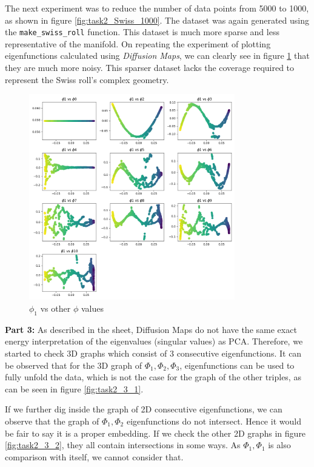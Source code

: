 The next experiment was to reduce the number of data points from 5000 to 1000, as shown in figure \ref{fig:task2_Swiss_1000}. The dataset was again generated using the \texttt{make\_swiss\_roll} function. This dataset is much more sparse and less representative of the manifold. On repeating the experiment of plotting eigenfunctions calculated using \textit{Diffusion Maps}, we can clearly see in figure \ref{fig:task2.22} that they are much more noisy. This sparser dataset lacks the coverage required to represent the Swiss roll's complex geometry.

\begin{figure}[H]
    \centering
    \includegraphics[width=0.8\textwidth]{images/ex3task2_1000vals.png}
    \caption{$\phi_1$ vs other $\phi$ values}
    \label{fig:task2.22}
\end{figure}


\textbf{Part 3:} As described in the sheet, Diffusion Maps do not have the same exact energy interpretation of the eigenvalues (singular values) as PCA. Therefore, we started to check 3D graphs which consist of 3 consecutive eigenfunctions. It can be observed that for the 3D graph of $\Phi_1, \Phi_2, \Phi_3$, eigenfunctions can be used to fully unfold the data, which is not the case for the graph of the other triples, as can be seen in figure \ref{fig:task2_3_1}. 


If we further dig inside the graph of 2D consecutive eigenfunctions, we can observe that the graph of $\Phi_1, \Phi_2 $ eigenfunctions do not intersect. Hence it would be fair to say it is a proper embedding. If we check the other 2D graphs in figure \ref{fig:task2_3_2}, they all contain intersections in some ways. As $\Phi_1, \Phi_1 $ is also comparison with itself, we cannot consider that.


